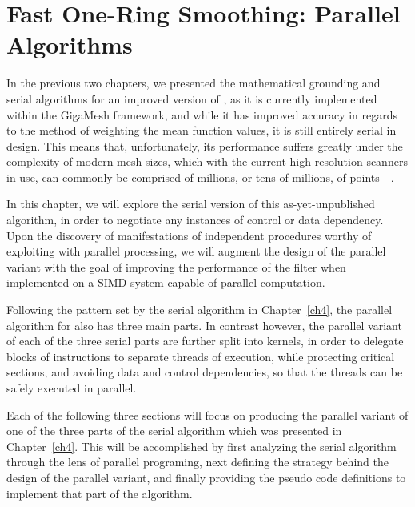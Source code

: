 \chapter{Fast One-Ring Smoothing: Parallel Algorithms}
\label{ch5}
In the previous two chapters, we presented the mathematical grounding and serial algorithms for an improved version of , as it is currently implemented within the GigaMesh framework, and while it has improved accuracy in regards to the method of weighting the mean function values, it is still entirely serial in design. This means that, unfortunately, its performance suffers greatly under the complexity of modern mesh sizes, which with the current high resolution scanners in use, can commonly be comprised of millions, or tens of millions, of points~\cite[25,144]{Mara17}~\cite[4]{ILATO14}.

In this chapter, we will explore the serial version of this as-yet-unpublished algorithm, in order to negotiate any instances of control or data dependency. Upon the discovery of manifestations of independent procedures worthy of exploiting with parallel processing, we will augment the design of the parallel variant with the goal of improving the performance of the filter when implemented on a \gls{SIMD} system capable of parallel computation.

Following the pattern set by the serial algorithm in Chapter~\ref{ch4}, the parallel algorithm for  also has three main parts. In contrast however, the parallel variant of each of the three serial parts are further split into kernels, in order to delegate blocks of instructions to separate threads of execution, while protecting critical sections, and avoiding data and control dependencies, so that the threads can be safely executed in parallel.

Each of the following three sections will focus on producing the parallel variant of one of the three parts of the serial algorithm which was presented in Chapter~\ref{ch4}. This will be accomplished by first analyzing the serial algorithm through the lens of parallel programing, next defining the strategy behind the design of the parallel variant, and finally providing the pseudo code definitions to implement that part of the algorithm.

%
%
%
%
